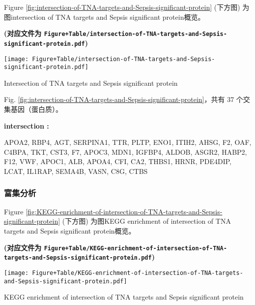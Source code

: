 \documentclass[
]{article}
\begin{document}
Figure \ref{fig:intersection-of-TNA-targets-and-Sepsis-significant-protein} (下方图) 为图intersection of TNA targets and Sepsis significant protein概览。

\textbf{(对应文件为 \texttt{Figure+Table/intersection-of-TNA-targets-and-Sepsis-significant-protein.pdf})}

\def\@captype{figure}
\begin{center}
\texttt{[image: Figure+Table/intersection-of-TNA-targets-and-Sepsis-significant-protein.pdf]}
\caption{Intersection of TNA targets and Sepsis significant protein}\label{fig:intersection-of-TNA-targets-and-Sepsis-significant-protein}
\end{center}

Fig. \ref{fig:intersection-of-TNA-targets-and-Sepsis-significant-protein}，共有 37 个交集基因（蛋白质）。

\begin{center}\begin{tcolorbox}[colback=gray!10, colframe=gray!50, width=0.9\linewidth, arc=1mm, boxrule=0.5pt]
\textbf{
intersection
:}

\vspace{0.5em}

    APOA2, RBP4, AGT, SERPINA1, TTR, PLTP, ENO1, ITIH2,
AHSG, F2, OAF, C4BPA, TKT, CST3, F7, APOC3, MDN1, IGFBP4,
ALDOB, ASGR2, HABP2, F12, VWF, APOC1, ALB, APOA4, CFI, CA2,
THBS1, HRNR, PDE4DIP, LCAT, IL1RAP, SEMA4B, VASN, C8G, CTBS

\vspace{2em}
\end{tcolorbox}
\end{center}

\hypertarget{ux5bccux96c6ux5206ux6790-1}{%
\subsubsection{富集分析}\label{ux5bccux96c6ux5206ux6790-1}}

Figure \ref{fig:KEGG-enrichment-of-intersection-of-TNA-targets-and-Sepsis-significant-protein} (下方图) 为图KEGG enrichment of intersection of TNA targets and Sepsis significant protein概览。

\textbf{(对应文件为 \texttt{Figure+Table/KEGG-enrichment-of-intersection-of-TNA-targets-and-Sepsis-significant-protein.pdf})}

\def\@captype{figure}
\begin{center}
\texttt{[image: Figure+Table/KEGG-enrichment-of-intersection-of-TNA-targets-and-Sepsis-significant-protein.pdf]}
\caption{KEGG enrichment of intersection of TNA targets and Sepsis significant protein}\label{fig:KEGG-enrichment-of-intersection-of-TNA-targets-and-Sepsis-significant-protein}
\end{center}
\end{document}
